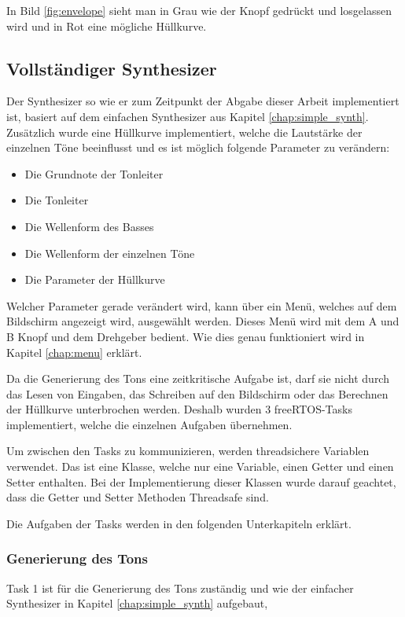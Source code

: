 In Bild \ref{fig:envelope} sieht man in Grau wie der Knopf gedrückt und losgelassen 
wird und in Rot eine mögliche Hüllkurve.

\subsection{Vollständiger Synthesizer}

Der Synthesizer so wie er zum Zeitpunkt der Abgabe dieser Arbeit implementiert ist, 
basiert auf dem einfachen Synthesizer aus Kapitel \ref{chap:simple_synth}. Zusätzlich wurde
eine Hüllkurve implementiert, welche die Lautstärke der einzelnen Töne
beeinflusst und es ist möglich folgende Parameter zu verändern:
\begin{itemize}
    \item Die Grundnote der Tonleiter
    \item Die Tonleiter
    \item Die Wellenform des Basses
    \item Die Wellenform der einzelnen Töne
    \item Die Parameter der Hüllkurve
\end{itemize}

Welcher Parameter gerade verändert wird, kann über ein Menü, welches auf dem Bildschirm
angezeigt wird, ausgewählt werden. Dieses Menü wird mit dem A und B Knopf und dem
Drehgeber bedient. Wie dies genau funktioniert wird in Kapitel \ref{chap:menu} erklärt.

Da die Generierung des Tons eine zeitkritische Aufgabe ist, darf sie nicht durch
das Lesen von Eingaben, das Schreiben auf den Bildschirm oder das Berechnen der
Hüllkurve unterbrochen werden. Deshalb wurden 3 freeRTOS-Tasks implementiert, 
welche die einzelnen Aufgaben übernehmen.

Um zwischen den Tasks zu kommunizieren, werden threadsichere Variablen verwendet.
Das ist eine Klasse, welche nur eine Variable, einen Getter und einen Setter 
enthalten. Bei der Implementierung dieser Klassen wurde darauf geachtet, dass
die Getter und Setter Methoden Threadsafe sind. 

Die Aufgaben der Tasks werden in den folgenden Unterkapiteln erklärt.

\subsubsection{Generierung des Tons}

Task 1 ist für die Generierung des Tons zuständig und wie der einfacher Synthesizer 
in Kapitel \ref{chap:simple_synth} aufgebaut, 

